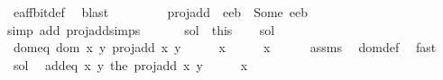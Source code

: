 \begin{isabellebody}
\ e{\isacharunderscore}aff{\isacharunderscore}bit{\isacharunderscore}def\ \isamarkupfalse%
\ blast{\isacharplus}\ \ \ \isanewline
\ \ \ \ \isamarkupfalse%
\ {\isachardoublequoteopen}proj{\isacharunderscore}add\ {\isacharparenleft}{\isacharparenleft}{}{\isacharcomma}{}{\isacharparenright}{\isacharcomma}{}{\isacharparenright}\ {\isacharparenleft}{\isacharparenleft}e{}{\isacharcomma}e{}{\isacharparenright}{\isacharcomma}b{\isacharparenright}\ {\isacharequal}\ Some\ {\isacharparenleft}{\isacharparenleft}e{}{\isacharcomma}e{}{\isacharparenright}{\isacharcomma}b{\isacharparenright}{\isachardoublequoteclose}\isanewline
\ \ \ \ \ \ \isamarkupfalse%
\ {}\ {}\ \isamarkupfalse%
{\isacharparenleft}simp\ add{\isacharcolon}\ proj{\isacharunderscore}add{\isachardot}simps{\isacharparenright}\isanewline
\ \ \isacommand{{\isacharbraceright}}\isamarkupfalse%
\isanewline
\ \ \isamarkupfalse%
\ sol\ {\isacharequal}\ this\isanewline
\ \ \isamarkupfalse%
\ sol\ \isamarkupfalse%
\ dom{\isacharunderscore}eq{\isacharcolon}\ {\isachardoublequoteopen}{\isacharparenleft}dom\ {\isacharparenleft}{\isasymlambda}{\isacharparenleft}x{\isacharcomma}\ y{\isacharparenright}{\isachardot}\ proj{\isacharunderscore}add\ x\ y{\isacharparenright}\ {\isasyminter}\ {\isacharbraceleft}{\isacharparenleft}{\isacharparenleft}{}{\isacharcomma}\ {}{\isacharparenright}{\isacharcomma}\ {}{\isacharparenright}{\isacharbraceright}\ {\isasymtimes}\ x{\isacharparenright}\ {\isacharequal}\ {\isacharbraceleft}{\isacharparenleft}{\isacharparenleft}{}{\isacharcomma}\ {}{\isacharparenright}{\isacharcomma}\ {}{\isacharparenright}{\isacharbraceright}\ {\isasymtimes}\ x{\isachardoublequoteclose}\isanewline
\ \ \ \ \isamarkupfalse%
\ assms\ \isamarkupfalse%
\ dom{\isacharunderscore}def\ \isamarkupfalse%
\ fast\isanewline
\ \ \isamarkupfalse%
\ sol\ \isamarkupfalse%
\ add{\isacharunderscore}eq{\isacharcolon}\ {\isachardoublequoteopen}{\isacharparenleft}{\isasymlambda}{\isacharparenleft}x{\isacharcomma}\ y{\isacharparenright}{\isachardot}\ the\ {\isacharparenleft}proj{\isacharunderscore}add\ x\ y{\isacharparenright}{\isacharparenright}\ {\isacharbackquote}\ {\isacharparenleft}{\isacharbraceleft}{\isacharparenleft}{\isacharparenleft}{}{\isacharcomma}\ {}{\isacharparenright}{\isacharcomma}\ {}{\isacharparenright}{\isacharbraceright}\ {\isasymtimes}\ x{\isacharparenright}\ {\isacharequal}\ \isanewline

\end{isabellebody}
